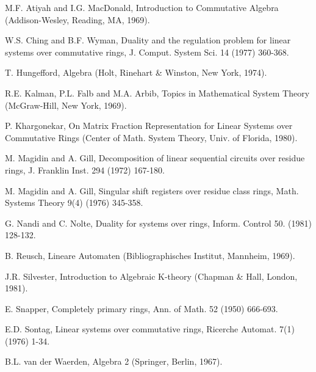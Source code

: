 \documentclass[a4paper,12pt]{article}
\begin{document}
\pagebreak
\begin{thebibliography}{99}
	
	M.F. Atiyah and I.G. MacDonald,
	Introduction to Commutative Algebra
	(Addison-Wesley, Reading, MA, 1969).
	
	W.S. Ching and B.F. Wyman,
	Duality and the regulation problem for linear systems over commutative rings,
	J. Comput. System Sci. 14 (1977) 360-368.

	T. Hungefford,
	Algebra
	(Holt, Rinehart \& Winston, New York, 1974).
	
	R.E. Kalman, P.L. Falb and M.A. Arbib,
	Topics in Mathematical System Theory
	(McGraw-Hill, New York, 1969).
	
	P. Khargonekar, On Matrix Fraction Representation for Linear Systems over Commutative Rings
	(Center of Math. System Theory, Univ. of Florida, 1980).
	
	M. Magidin and A. Gill,
	Decomposition of linear sequential circuits over residue rings,
	J. Franklin Inst. 294 (1972) 167-180.
	
	M. Magidin and A. Gill,
	Singular shift registers over residue class rings,
	Math. Systems Theory 9(4) (1976) 345-358.
	
	G. Nandi and C. Nolte,
	Duality for systems over rings,
	Inform. Control 50. (1981) 128-132.
	
	B. Reusch,
	Lineare Automaten
	(Bibliographisches Institut, Mannheim, 1969).
	
	J.R. Silvester,
	Introduction to Algebraic K-theory
	(Chapman \& Hall, London, 1981).
	
	E. Snapper,
	Completely primary rings,
	Ann. of Math. 52 (1950) 666-693.
	
	E.D. Sontag,
	Linear systems over commutative rings, Ricerche Automat.
	7(1) (1976) 1-34.
	
	B.L. van der Waerden,
	Algebra 2
	(Springer, Berlin, 1967).
	
\end{thebibliography}
\end{document}
